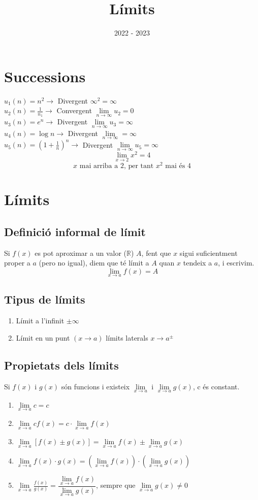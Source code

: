 \documentclass[12pt,a4paper]{article}
\title{Límits}
\author{}
\date{2022 - 2023}
\begin{document}
\maketitle

\section{Successions}

$u_1(n)=n^2 \rightarrow$ Divergent $\infty^2=\infty$\\[5pt]
$u_2(n)=\frac{1}{n_1} \rightarrow$ Convergent $\lim\limits_{n\to\infty}u_2=0$\\[5pt]
$u_3(n)=e^n \rightarrow$ Divergent $\lim\limits_{n\to\infty} u_3=\infty$\\[5pt]
$u_4(n)=\log n \rightarrow$ Divergent $\lim\limits_{n\to\infty}=\infty$\\[5pt]
$u_5(n)=\left(1+\frac{1}{n}\right)^n \rightarrow$ Divergent $\lim\limits_{n\to\infty}u_5 =\infty$\\[10pt]
$$\lim\limits_{x\to 2} x^2=4$$
$$\text{$x$ mai arriba a $2$, per tant $x^2$ mai és $4$}$$
\section{Límits}
\subsection{Definició informal de límit}
Si $f(x)$ es pot aproximar a un valor ($\mathbb{R}$) $A$, fent que $x$ sigui suficientment proper a $a$ (pero no igual), diem que té límit a $A$ quan $x$ tendeix a $a$, i escrivim.
$$\lim\limits_{x\to a} f(x)=A$$
\subsection{Tipus de límits}
\begin{enumerate}
    \item Límit a l'infinit $\pm\infty$
    \item Límit en un punt $(x\to a )$ límits laterals $x\to a^{\pm}$
\end{enumerate}
\newpage
\subsection{Propietats dels límits}
Si $f(x)$ i $g(x)$ són funcions i existeix $\lim\limits_{x\to a}$ i $\lim\limits_{x\to a} g(x)$, c és constant.
\begin{enumerate}
    \item $\lim\limits_{x\to a} c=c$
    \item $\lim\limits_{x\to a} cf(x) =c\cdot\lim\limits_{x\to a}f(x)$
    \item $\lim\limits_{x\to a} \left[f(x) \pm g(x)\right]=\lim\limits_{x\to a} f(x) \pm \lim\limits_{x\to a} g(x)$
    \item $\lim\limits_{x\to a} f(x)\cdot g(x)=\left(\lim\limits_{x\to a} f(x)\right)\cdot \left(\lim\limits_{x\to a} g(x)\right)$
    \item $\lim\limits_{x\to a} \frac{f(x)}{g(x)}=\dfrac{\lim\limits_{x\to a} f(x)}{\lim\limits_{x\to a} g(x)}$, sempre que $\lim\limits_{x\to a} g(x) \neq 0$
\end{enumerate}
\end{document}
